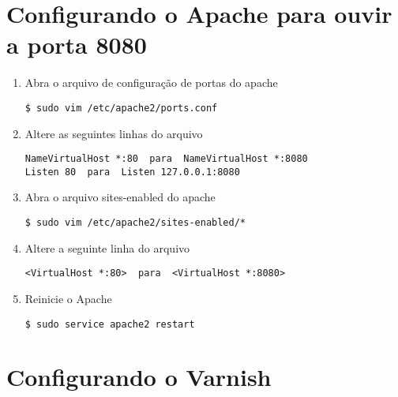 \section{Configurando o Apache para ouvir a porta 8080}
\begin{enumerate}[label=\alph*)]

\item Abra o arquivo de configuração de portas do apache
\begin{lstlisting}
$ sudo vim /etc/apache2/ports.conf
\end{lstlisting}

\item Altere as seguintes linhas do arquivo
\begin{lstlisting}
NameVirtualHost *:80  para  NameVirtualHost *:8080
Listen 80  para  Listen 127.0.0.1:8080
\end{lstlisting}

\item Abra o arquivo sites-enabled do apache
\begin{lstlisting}
$ sudo vim /etc/apache2/sites-enabled/*
\end{lstlisting}

\item Altere a seguinte linha do arquivo
\begin{lstlisting}
<VirtualHost *:80>  para  <VirtualHost *:8080>
\end{lstlisting}

\item Reinicie o Apache
\begin{lstlisting}
$ sudo service apache2 restart
\end{lstlisting}

\end{enumerate}

\section{Configurando o Varnish}


